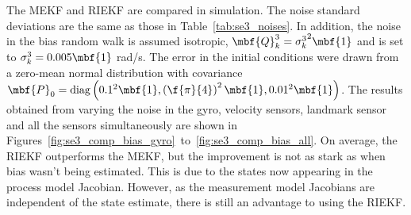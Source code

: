 The MEKF and RIEKF are compared in simulation. The noise standard deviations are the same as those in Table~\ref{tab:se3_noises}. In addition, the noise in the bias random walk is assumed isotropic, $\mbf{Q}_k^3 = {\sigma_k^3}^2\mbf{1}$ and is set to $\sigma_k^3 = 0.005\mbf{1}$ \si{rad/s}. The error in the initial conditions were drawn from a zero-mean normal distribution with covariance $\mbf{P}_0 = \mathrm{diag}\left(0.1^2 \mbf{1}, \left(\f{\pi}{4}\right)^2\mbf{1},0.01^2\mbf{1}\right)$. The results obtained from varying the noise in the gyro, velocity sensors, landmark sensor and all the sensors simultaneously  are shown in Figures~\ref{fig:se3_comp_bias_gyro}~to~\ref{fig:se3_comp_bias_all}. On average, the RIEKF outperforms the MEKF, but the improvement is not as stark as when bias wasn't being estimated. This is due to the states now appearing in the process model Jacobian. However, as the measurement model Jacobians are independent of the state estimate, there is still an advantage to using the RIEKF.
